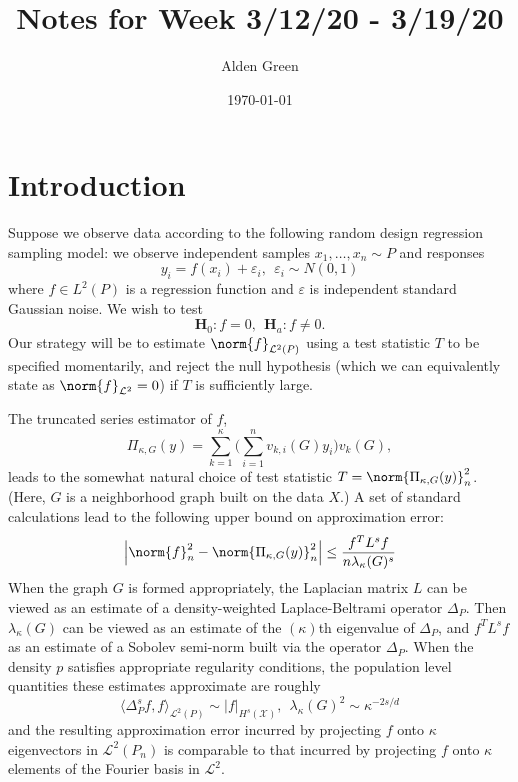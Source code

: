 \documentclass{article}
\newcommand{\abs}[1]{\left \lvert #1 \right \rvert}
\newcommand{\1}{\mathbf{1}}
\newcommand{\Leb}{\mathcal{L}}
\theoremstyle{alden}
\theoremstyle{aldenthm}
\theoremstyle{definition}
\theoremstyle{remark}
\begin{document}
\title{Notes for Week 3/12/20 - 3/19/20}
\author{Alden Green}
\date{\today}
\maketitle

\section{Introduction}

Suppose we observe data according to the following random design regression sampling model: we observe independent samples $x_1,\ldots,x_n \sim P$ and responses
\begin{equation}
\label{eqn:regression_random_design_known_variance}
y_i = f(x_i) + \varepsilon_i,~~\varepsilon_i \sim N(0,1)
\end{equation}
where $f \in L^2(P)$ is a regression function and $\varepsilon$ is independent standard Gaussian noise. We wish to test
\begin{equation*}
\mathbf{H}_0: f = 0,~~ \mathbf{H}_a: f \neq 0.
\end{equation*}
Our strategy will be to estimate $\norm{f}_{\Leb^2(P)}$ using a test statistic $T$ to be specified momentarily, and reject the null hypothesis (which we can equivalently state as $\norm{f}_{\Leb^2} = 0$) if $T$ is sufficiently large. 

The truncated series estimator of $f$,
\begin{equation*}
\Pi_{\kappa,G}(y) = \sum_{k = 1}^{\kappa} \biggl(\sum_{i = 1}^{n} v_{k,i}(G) y_i\biggr) v_k(G), 
\end{equation*}
leads to the somewhat natural choice of test statistic $T = \norm{\Pi_{\kappa,G}(y)}_n^2$. (Here, $G$ is a neighborhood graph built on the data $X$.)
A set of standard calculations lead to the following upper bound on approximation error:
\begin{equation*}
\abs{\norm{f}_{n}^2 - \norm{\Pi_{\kappa,G}(y)}_n^2} \leq \frac{f^T L^s f}{n \lambda_{\kappa}(G)^s}
\end{equation*}
When the graph $G$ is formed appropriately, the Laplacian matrix $L$ can be viewed as an estimate of a density-weighted Laplace-Beltrami operator $\Delta_P$. Then $\lambda_{\kappa}(G)$ can be viewed as an estimate of the $(\kappa)$th eigenvalue of $\Delta_P$, and $f^T L^s f$ as an estimate of a Sobolev semi-norm built via the operator $\Delta_P$. When the density $p$ satisfies appropriate regularity conditions, the population level quantities these estimates approximate are roughly
\begin{equation*}
\langle \Delta_P^s f, f \rangle_{\Leb^2(P)} \sim |f|_{H^{s}(\mathcal{X})}, ~~ \lambda_{\kappa}(G)^2 \sim \kappa^{-2s/d}
\end{equation*}
and the resulting approximation error incurred by projecting $f$ onto $\kappa$ eigenvectors in $\Leb^2(P_n)$ is comparable to that incurred by projecting $f$ onto $\kappa$ elements of the Fourier basis in $\Leb^2$.
\end{document}
